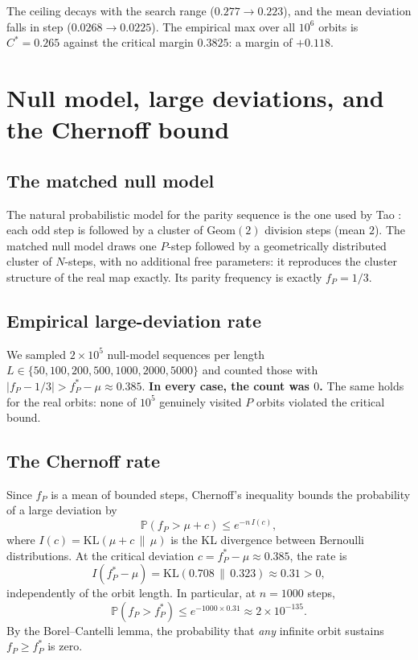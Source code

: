 \documentclass[12pt,reqno]{amsart}
\theoremstyle{plain}
\theoremstyle{definition}
\newcommand{\PP}{\mathbb{P}}
\newcommand{\fP}{f_P}
\newcommand{\fPstar}{f_P^*}
\begin{document}
The ceiling decays with the search range ($0.277 \to 0.223$), and the mean
deviation falls in step ($0.0268 \to 0.0225$). The empirical max over all
$10^6$ orbits is $C^* = 0.265$ against the critical margin $0.3825$:
a margin of $+0.118$.

\section{Null model, large deviations, and the Chernoff bound}

\subsection{The matched null model}

The natural probabilistic model for the parity sequence is the one used by Tao
\cite{tao2019}: each odd step is followed by a cluster of $\mathrm{Geom}(2)$
division steps (mean $2$). The matched null model draws one $P$-step followed
by a geometrically distributed cluster of $N$-steps, with no additional free
parameters: it reproduces the cluster structure of the real map exactly. Its
parity frequency is exactly $\fP = 1/3$.

\subsection{Empirical large-deviation rate}

We sampled $2\times10^5$ null-model sequences per length $L \in \{50, 100, 200,
500, 1000, 2000, 5000\}$ and counted those with $|\fP - 1/3| > \fPstar - \mu \approx
0.385$. \textbf{In every case, the count was $0$.} The same holds for the real
orbits: none of $10^5$ genuinely visited $P$ orbits violated the critical bound.

\subsection{The Chernoff rate}

Since $\fP$ is a mean of bounded steps, Chernoff's inequality
\cite{chernoff1952} bounds the probability of a large deviation by
\[
\PP\!\left(\fP > \mu + c\right) \le e^{-n\,I(c)},
\]
where $I(c) = \mathrm{KL}(\mu + c \,\|\, \mu)$ is the KL divergence between
Bernoulli distributions. At the critical deviation $c = \fPstar - \mu \approx
0.385$, the rate is
\[
I\!\left(\fPstar - \mu\right) = \mathrm{KL}(0.708 \,\|\, 0.323) \approx 0.31 > 0,
\]
independently of the orbit length. In particular, at $n = 1000$ steps,
\[
\PP\!\left(\fP > \fPstar\right) \le e^{-1000 \times 0.31} \approx 2\times10^{-135}.
\]
By the Borel--Cantelli lemma, the probability that \emph{any} infinite orbit
sustains $\fP \ge \fPstar$ is zero.
\end{document}
